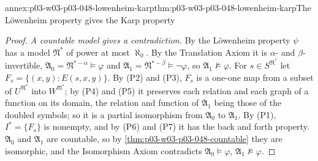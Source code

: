 \begin{annexitem}{annex:p03-w03-p03-048-lowenheim-karp}{thm:p03-w03-p03-048-lowenheim-karp}{The L\"owenheim property gives the Karp property}
\begin{proof}
\emph{A countable model gives a contradiction.}  By the L\"owenheim property
\(\psi\) has a model \(\mathfrak N^{\ast}\) of power at most \(\aleph_0\).  By
the Translation Axiom it is \(\alpha\)- and \(\beta\)-invertible,
\(\mathfrak A_0=\mathfrak N^{\ast-\alpha}\models\varphi\) and
\(\mathfrak A_1=\mathfrak N^{\ast-\beta}\models\neg\varphi\), so
\(\mathfrak A_1\not\models\varphi\).  For \(s\in S^{\mathfrak N^{\ast}}\) let
\(F_s=\{(x,y):E(s,x,y)\}\).  By (P2) and (P3), \(F_s\) is a one-one map from
a subset of \(U^{\mathfrak N^{\ast}}\) into \(W^{\mathfrak N^{\ast}}\); by
(P4) and (P5) it preserves each relation and each graph of a function on its
domain, the relation and function of \(\mathfrak A_1\) being those of the
doubled symbols; so it is a partial isomorphism from \(\mathfrak A_0\) to
\(\mathfrak A_1\).  By (P1), \(I^{\ast}=\{F_s\}\) is nonempty, and by (P6)
and (P7) it has the back and forth property.  \(\mathfrak A_0\) and
\(\mathfrak A_1\) are countable, so by
\cref{thm:p03-w03-p03-048-countable} they are isomorphic, and the
Isomorphism Axiom contradicts \(\mathfrak A_0\models\varphi\),
\(\mathfrak A_1\not\models\varphi\).
\end{proof}
\end{annexitem}

